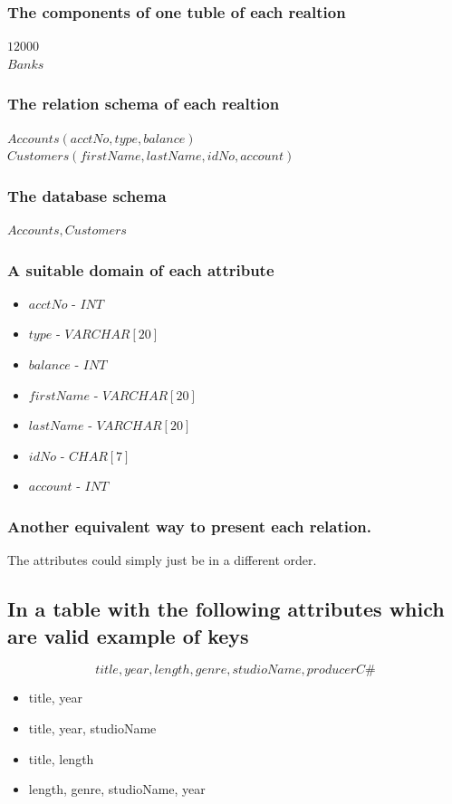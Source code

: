 \documentclass[12pt, a4paper]{article}
\begin{document}
				\subsubsection{The components of one tuble of each realtion}
					$12000$\\
					$Banks$
				\subsubsection{The relation schema of each realtion}
					$Accounts(acctNo, type, balance)$\\
					$Customers(firstName, lastName, idNo,account)$
				\subsubsection{The database schema}
					$Accounts, Customers$
				\subsubsection{A suitable domain of each attribute}
					\begin{itemize}
						\item $acctNo$ - $INT$
						\item $type$ - $VARCHAR[20]$
						\item $balance$ - $INT$
						\item $firstName$ - $VARCHAR[20]$
						\item $lastName$ - $VARCHAR[20]$
						\item $idNo$ - $CHAR[7]$
						\item $account$ - $INT$
					\end{itemize}
				\subsubsection{Another equivalent way to present each relation.}
					The attributes could simply just be in a different order.
			\subsection{In a table with the following attributes which are valid example of keys}
				$$title, year, length, genre, studioName, producerC\#$$
				\begin{itemize}
					\item title, year
					\item title, year, studioName
					\item title, length
					\item length, genre, studioName, year
				\end{itemize}
\end{document}
